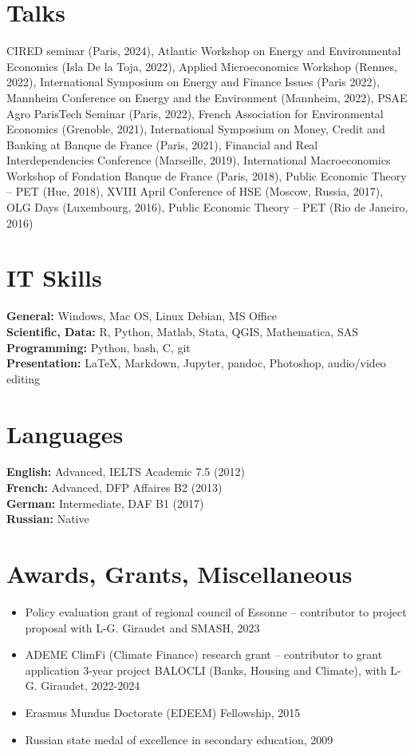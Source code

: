 \documentclass[letterpaper,11pt]{article}
\begin{document}
\section*{Talks}

CIRED seminar (Paris, 2024), Atlantic Workshop on Energy and Environmental Economics (Isla De la Toja, 2022), Applied Microeconomics Workshop (Rennes, 2022), International Symposium on Energy and Finance Issues (Paris 2022), Mannheim Conference on Energy and the Environment (Mannheim, 2022), PSAE Agro ParisTech Seminar (Paris, 2022), French Association for Environmental Economics (Grenoble, 2021), International Symposium on Money, Credit and Banking at Banque de France (Paris, 2021), Financial and Real Interdependencies Conference (Marseille, 2019), International Macroeconomics Workshop of Fondation Banque de France (Paris, 2018), Public Economic Theory -- PET (Hue, 2018), XVIII April Conference of HSE (Moscow, Russia, 2017), OLG Days (Luxembourg, 2016), Public Economic Theory -- PET (Rio de Janeiro, 2016)

\section*{IT Skills}
\textbf{General:} Windows, Mac OS, Linux Debian, MS Office\\
\textbf{Scientific, Data:} R, Python, Matlab, Stata, QGIS, Mathematica, SAS\\
\textbf{Programming:} Python, bash, C, git\\
\textbf{Presentation:} \LaTeX, Markdown, Jupyter, pandoc, Photoshop, audio/video editing

\section*{Languages}
\textbf{English:} Advanced, IELTS Academic 7.5 (2012)\\
\textbf{French:} Advanced, DFP Affaires B2 (2013)\\
\textbf{German:} Intermediate, DAF B1 (2017)\\
\textbf{Russian:} Native

\section*{Awards, Grants, Miscellaneous}
\begin{itemize}[leftmargin=*]
    \item Policy evaluation grant of regional council of Essonne -- contributor to project proposal with L-G. Giraudet and SMASH, 2023
    \item ADEME ClimFi (Climate Finance) research grant -- contributor to grant application 3-year project BALOCLI (Banks, Housing and Climate), with L-G. Giraudet, 2022-2024
    \item Erasmus Mundus Doctorate (EDEEM) Fellowship, 2015
    \item Russian state medal of excellence in secondary education, 2009
\end{itemize}
\end{document}
